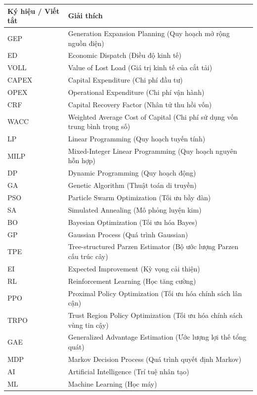 \documentclass[12pt, a4paper]{report}
\begin{document}
\begin{longtable}{@{}p{3.0cm}p{11.5cm}@{}}
  \toprule
  \textbf{Ký hiệu / Viết tắt} & \textbf{Giải thích} \\
  \midrule
  \endhead
  GEP   & Generation Expansion Planning (Quy hoạch mở rộng nguồn điện) \\
  ED    & Economic Dispatch (Điều độ kinh tế) \\
  VOLL  & Value of Lost Load (Giá trị kinh tế của cắt tải) \\
  CAPEX & Capital Expenditure (Chi phí đầu tư) \\
  OPEX  & Operational Expenditure (Chi phí vận hành) \\
  CRF   & Capital Recovery Factor (Nhân tử thu hồi vốn) \\
  WACC  & Weighted Average Cost of Capital (Chi phí sử dụng vốn trung bình trọng số) \\
  LP    & Linear Programming (Quy hoạch tuyến tính) \\
  MILP  & Mixed-Integer Linear Programming (Quy hoạch nguyên hỗn hợp) \\
  DP    & Dynamic Programming (Quy hoạch động) \\
  GA    & Genetic Algorithm (Thuật toán di truyền) \\
  PSO   & Particle Swarm Optimization (Tối ưu bầy đàn) \\
  SA    & Simulated Annealing (Mô phỏng luyện kim) \\
  BO    & Bayesian Optimization (Tối ưu hóa Bayes) \\
  GP    & Gaussian Process (Quá trình Gaussian) \\
  TPE   & Tree-structured Parzen Estimator (Bộ ước lượng Parzen cấu trúc cây) \\
  EI    & Expected Improvement (Kỳ vọng cải thiện) \\
  RL    & Reinforcement Learning (Học tăng cường) \\
  PPO   & Proximal Policy Optimization (Tối ưu hóa chính sách lân cận) \\
  TRPO  & Trust Region Policy Optimization (Tối ưu hóa chính sách vùng tin cậy) \\
  GAE   & Generalized Advantage Estimation (Ước lượng lợi thế tổng quát) \\
  MDP   & Markov Decision Process (Quá trình quyết định Markov) \\
  AI    & Artificial Intelligence (Trí tuệ nhân tạo) \\
  ML    & Machine Learning (Học máy) \\

\end{longtable}
\end{document}
